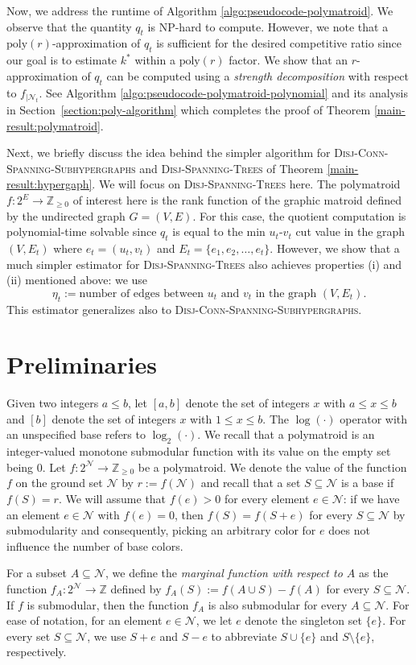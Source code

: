 \documentclass[11pt]{article}
\theoremstyle{definition}
\newcommand{\calN}{{\mathcal{N}}}
\newcommand{\Z}{\mathbb{Z}}
\newcommand{\DST}{\textsc{Disj-Spanning-Trees}\xspace}
\newcommand{\DCSS}{\textsc{Disj-Conn-Spanning-Subhypergraphs}\xspace}
\begin{document}
Now, we address the runtime of Algorithm \ref{algo:pseudocode-polymatroid}. We observe that the quantity $q_t$ is NP-hard to compute. 
However, we note that a $\text{poly}(r)$-approximation of $q_t$ is sufficient for the desired competitive ratio since our goal is to estimate $k^*$ within a $\text{poly}(r)$ factor. We show that an $r$-approximation of $q_t$ can be computed using a \emph{strength decomposition} with respect to $f_{|\mathcal{N}_t}$. 
See Algorithm \ref{algo:pseudocode-polymatroid-polynomial} and its analysis in Section~\ref{section:poly-algorithm} which completes the proof of Theorem \ref{main-result:polymatroid}.
\fi

Next, we briefly discuss the idea behind the simpler algorithm for \DCSS and \DST of Theorem \ref{main-result:hypergaph}. We will focus on \DST here. The polymatroid $f:2^E\rightarrow \Z_{\ge 0}$ of interest here is the rank function of the graphic matroid defined by the undirected graph $G=(V, E)$. For this case, the quotient computation
is polynomial-time solvable since $q_t$ is equal to the min $u_t$-$v_t$ cut value in the graph $(V, E_t)$ where $e_t =(u_t,v_t)$ and $E_t = \{e_1, e_2, \ldots, e_t\}$.  However, we show that a much simpler estimator for \DST also achieves properties (i) and (ii) mentioned above: we use 
\[
\eta_t:= \text{number of edges between $u_t$ and $v_t$ in the graph $(V, E_t)$}.
\]
This estimator generalizes also to \DCSS. 

%
 \section{Preliminaries}\label{section:prelim}
Given two integers $a\leq b$, let $[a,b]$ denote the set of integers $x$ with $a\leq x \leq b$ and $[b]$ denote the set of integers $x$ with $1\leq x \leq b$. The $\log(\cdot)$ operator with an unspecified base refers to $\log_2(\cdot)$.
We recall that a polymatroid is an integer-valued monotone submodular function with its value on the empty set being $0$. Let $f:2^\mathcal{N}\rightarrow \mathbb{Z}_{\geq 0}$ be a polymatroid. 
We denote the value of the function $f$ on the ground set $\calN$ by $r:=f(\mathcal{N})$ and recall that a set $S\subseteq \calN$ is a base if $f(S) = r$. 
We will assume that $f(e)>0$ for every element $e\in \calN$: if we have an element $e\in \calN$ with $f(e)=0$, then $f(S) = f(S+e)$ for every $S\subseteq \calN$ by submodularity and consequently, picking an arbitrary color for $e$ does not influence the number of base colors.  

For a subset $A\subseteq \mathcal{N}$, we define the \emph{marginal function with respect to $A$} as the function $f_A:2^\mathcal{N}\rightarrow \mathbb{Z}$ defined by $f_A(S):=f(A\cup S)-f(A)$ for every $S\subseteq \mathcal{N}$. If $f$ is submodular, then the function $f_A$ is also submodular for every $A\subseteq \mathcal{N}$. For ease of notation, for an element $e\in \mathcal{N}$, we let $e$ denote the singleton set $\{e\}$. For every set $S\subseteq \mathcal{N}$, we use $S+e$ and $S-e$ to abbreviate $S\cup \{e\}$ and $S\setminus \{e\}$, respectively.
\end{document}
